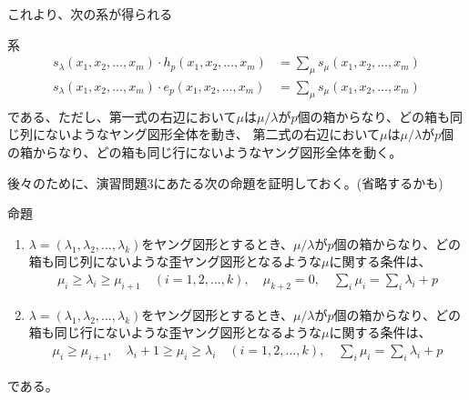 \documentclass[a4paper,11pt]{jsarticle}
\theoremstyle{plain}
\theoremstyle{definition}
\renewcommand{\(}{\left(}
\renewcommand{\)}{\right)}
\renewcommand{\[}{\left[}
\renewcommand{\]}{\right]}
\renewcommand{\{}{\left\lbrace}
\renewcommand{\}}{\right\rbrace}
\begin{document}
これより、次の系が得られる

\begin{itembox}[l]{系}
    \begin{align*}
        s_\lambda(x_1, x_2, \ldots, x_m) \cdot h_p(x_1, x_2, \ldots, x_m) &= \sum_{\mu}s_\mu(x_1,x_2,\ldots,x_m) \\
        s_\lambda(x_1, x_2, \ldots, x_m) \cdot e_p(x_1, x_2, \ldots, x_m) &= \sum_{\mu}s_\mu(x_1,x_2,\ldots,x_m) \\
    \end{align*}
    である、ただし、第一式の右辺において$\mu$は$\mu/\lambda$が$p$個の箱からなり、どの箱も同じ列にないようなヤング図形全体を動き、
    第二式の右辺において$\mu$は$\mu/\lambda$が$p$個の箱からなり、どの箱も同じ行にないようなヤング図形全体を動く。
\end{itembox}

後々のために、演習問題3にあたる次の命題を証明しておく。(省略するかも)

\begin{itembox}[l]{命題}
    \begin{enumerate}[(1)]
        \item $\lambda=(\lambda_1, \lambda_2, \ldots, \lambda_k)$をヤング図形とするとき、$\mu / \lambda$が$p$個の箱からなり、どの箱も同じ列にないような歪ヤング図形となるような$\mu$に関する条件は、
        \begin{align*}
            \mu_i \geq \lambda_i \geq \mu_{i+1} \quad (i=1,2,\ldots,k), \quad \mu_{k+2} = 0, \quad \sum_{i} \mu_i = \sum_{i} \lambda_i + p
        \end{align*}
        \item $\lambda=(\lambda_1, \lambda_2, \ldots, \lambda_k)$をヤング図形とするとき、$\mu / \lambda$が$p$個の箱からなり、どの箱も同じ行にないような歪ヤング図形となるような$\mu$に関する条件は、
        \begin{align*}
            \mu_{i} \geq \mu_{i+1},\quad \lambda_i+1 \geq \mu_i \geq \lambda_{i} \quad (i=1,2,\ldots,k), \quad \sum_{i} \mu_i = \sum_{i} \lambda_i + p
        \end{align*}
    \end{enumerate}
    である。
\end{itembox}
\end{document}
